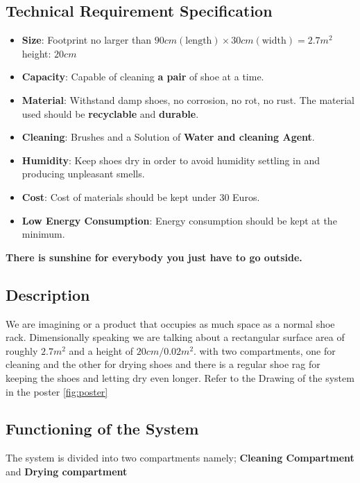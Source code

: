 \subsection{Technical Requirement Specification}
\begin{itemize}
  \item \textbf{Size}: Footprint no larger than  $90cm(\text{length}) \times 30cm(\text{width})
          = 2.7m^2$ height: $20cm$
  \item \textbf{Capacity}: Capable of cleaning \textbf{a pair} of shoe at a time.
  \item \textbf{Material}: Withstand damp shoes, no corrosion, no rot, no rust. The material used should be \textbf{recyclable} and \textbf{durable}.
  \item \textbf{Cleaning}: Brushes and a Solution of \textbf{Water and cleaning Agent}.
  \item \textbf{Humidity}: Keep shoes dry in order to avoid humidity settling in and producing
        unpleasant smells.
  \item \textbf{Cost}: Cost of materials should be kept under 30 Euros.
  \item \textbf{Low Energy Consumption}: Energy consumption should be kept at the minimum.
\end{itemize}

\textbf{There is sunshine for everybody you just have to go outside.}

\subsection{Description}
We are imagining or a product that occupies as much space as a normal shoe rack. Dimensionally
speaking we are talking about a rectangular surface area of roughly $2.7m^2$ and a height of
$20cm/0.02m^2$. with two compartments, one for cleaning and the other for drying shoes and there
is a regular shoe rag for keeping the shoes and letting dry even longer. Refer to the Drawing of the system in the poster \autoref{fig:poster}

\subsection{Functioning of the System}
The system is divided into two compartments namely;  \textbf{Cleaning Compartment} and
\textbf{Drying compartment}
